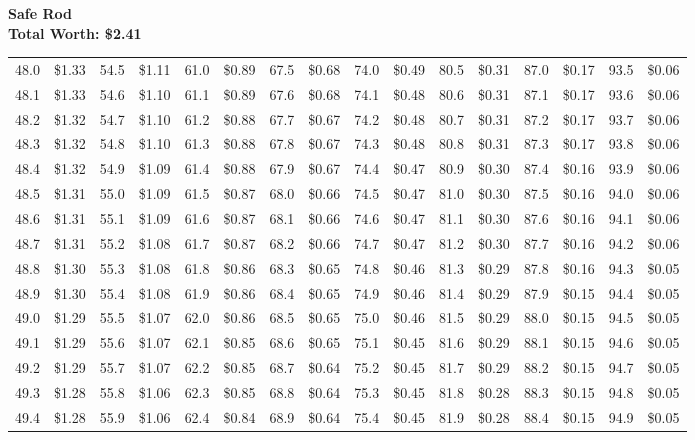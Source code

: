 \documentclass{article}
\begin{document}
\small
\centering
{\large\bf Safe Rod\\Total Worth: \$2.41}

\begin{tabular}{|*{8}{rr|}}
48.0 & \$1.33 & 54.5 & \$1.11 & 61.0 & \$0.89 & 67.5 & \$0.68 & 74.0 & \$0.49 & 80.5 & \$0.31 & 87.0 & \$0.17 & 93.5 & \$0.06\\
48.1 & \$1.33 & 54.6 & \$1.10 & 61.1 & \$0.89 & 67.6 & \$0.68 & 74.1 & \$0.48 & 80.6 & \$0.31 & 87.1 & \$0.17 & 93.6 & \$0.06\\
48.2 & \$1.32 & 54.7 & \$1.10 & 61.2 & \$0.88 & 67.7 & \$0.67 & 74.2 & \$0.48 & 80.7 & \$0.31 & 87.2 & \$0.17 & 93.7 & \$0.06\\
48.3 & \$1.32 & 54.8 & \$1.10 & 61.3 & \$0.88 & 67.8 & \$0.67 & 74.3 & \$0.48 & 80.8 & \$0.31 & 87.3 & \$0.17 & 93.8 & \$0.06\\
48.4 & \$1.32 & 54.9 & \$1.09 & 61.4 & \$0.88 & 67.9 & \$0.67 & 74.4 & \$0.47 & 80.9 & \$0.30 & 87.4 & \$0.16 & 93.9 & \$0.06\\
48.5 & \$1.31 & 55.0 & \$1.09 & 61.5 & \$0.87 & 68.0 & \$0.66 & 74.5 & \$0.47 & 81.0 & \$0.30 & 87.5 & \$0.16 & 94.0 & \$0.06\\
48.6 & \$1.31 & 55.1 & \$1.09 & 61.6 & \$0.87 & 68.1 & \$0.66 & 74.6 & \$0.47 & 81.1 & \$0.30 & 87.6 & \$0.16 & 94.1 & \$0.06\\
48.7 & \$1.31 & 55.2 & \$1.08 & 61.7 & \$0.87 & 68.2 & \$0.66 & 74.7 & \$0.47 & 81.2 & \$0.30 & 87.7 & \$0.16 & 94.2 & \$0.06\\
48.8 & \$1.30 & 55.3 & \$1.08 & 61.8 & \$0.86 & 68.3 & \$0.65 & 74.8 & \$0.46 & 81.3 & \$0.29 & 87.8 & \$0.16 & 94.3 & \$0.05\\
48.9 & \$1.30 & 55.4 & \$1.08 & 61.9 & \$0.86 & 68.4 & \$0.65 & 74.9 & \$0.46 & 81.4 & \$0.29 & 87.9 & \$0.15 & 94.4 & \$0.05\\
49.0 & \$1.29 & 55.5 & \$1.07 & 62.0 & \$0.86 & 68.5 & \$0.65 & 75.0 & \$0.46 & 81.5 & \$0.29 & 88.0 & \$0.15 & 94.5 & \$0.05\\
49.1 & \$1.29 & 55.6 & \$1.07 & 62.1 & \$0.85 & 68.6 & \$0.65 & 75.1 & \$0.45 & 81.6 & \$0.29 & 88.1 & \$0.15 & 94.6 & \$0.05\\
49.2 & \$1.29 & 55.7 & \$1.07 & 62.2 & \$0.85 & 68.7 & \$0.64 & 75.2 & \$0.45 & 81.7 & \$0.29 & 88.2 & \$0.15 & 94.7 & \$0.05\\
49.3 & \$1.28 & 55.8 & \$1.06 & 62.3 & \$0.85 & 68.8 & \$0.64 & 75.3 & \$0.45 & 81.8 & \$0.28 & 88.3 & \$0.15 & 94.8 & \$0.05\\
49.4 & \$1.28 & 55.9 & \$1.06 & 62.4 & \$0.84 & 68.9 & \$0.64 & 75.4 & \$0.45 & 81.9 & \$0.28 & 88.4 & \$0.15 & 94.9 & \$0.05\\

\end{tabular}
\end{document}
